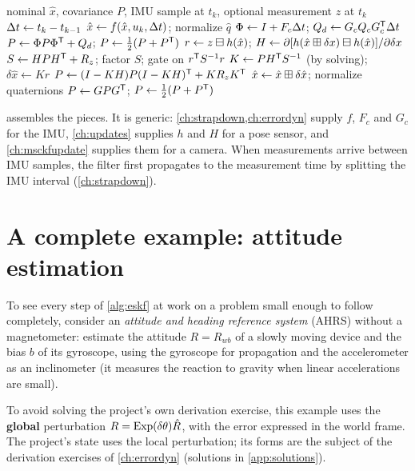 \begin{algorithm}[t]
\caption{Error-state Kalman filter (one IMU step and an optional update)}
\label{alg:eskf}
\begin{algorithmic}[1]
\Require nominal $\hat x$, covariance $P$, IMU sample at $t_k$, optional measurement $z$ at $t_k$
\State ${\Delta t} \gets t_k - t_{k-1}$ 
\State $\hat x \gets f(\hat x, u_k, {\Delta t})$; normalize $\hat q$ 
\State $\Phi \gets I + F_c{\Delta t}$; \quad $Q_d \gets G_cQ_cG_c^{\mathsf{T}}{\Delta t}$
\State $P \gets \Phi P\Phi^{\mathsf{T}} + Q_d$; \quad $P \gets \tfrac12(P + P^{\mathsf{T}})$
  \State $r \gets z\boxminus h(\hat x)$; \quad $H \gets \partial[h(\hat x\boxplus\delta x)\boxminus h(\hat x)]/\partial\delta x$
  \State $S \gets HPH^{\mathsf{T}} + R_z$; factor $S$; gate on $r^{\mathsf{T}} S^{-1} r$
  \State $K \gets PH^{\mathsf{T}} S^{-1}$ (by solving); \quad $\delta\hat x \gets Kr$
  \State $P \gets (I-KH)P(I-KH)^{\mathsf{T}} + KR_zK^{\mathsf{T}}$
  \State $\hat x \gets \hat x\boxplus\delta\hat x$; normalize quaternions 
  \State $P \gets GPG^{\mathsf{T}}$; \quad $P \gets \tfrac12(P + P^{\mathsf{T}})$ 
\EndIf
\end{algorithmic}
\end{algorithm}

 assembles the pieces. It is generic: \cref{ch:strapdown,ch:errordyn} supply $f$, $F_c$ and $G_c$ for the IMU, \cref{ch:updates} supplies $h$ and $H$ for a
pose sensor, and \cref{ch:msckfupdate} supplies them for a camera. When measurements arrive between IMU samples, the filter first propagates to the
measurement time by splitting the IMU interval (\cref{ch:strapdown}).

\section{A complete example: attitude estimation}
\label{sec:ahrs}

To see every step of \cref{alg:eskf} at work on a problem small enough to follow completely, consider an \emph{attitude and heading reference system}
(AHRS) without a magnetometer: estimate the attitude $R = R_{wb}$ of a slowly moving device and the bias $b$ of its gyroscope, using the gyroscope for
propagation and the accelerometer as an inclinometer (it measures the reaction to gravity when linear accelerations are small).

To avoid solving the project's own derivation exercise, this example uses the \textbf{global} perturbation $R = \operatorname{Exp}(\delta\theta)\hat R$, with the error
expressed in the world frame. The project's state uses the local perturbation; its forms are the subject of the derivation exercises of \cref{ch:errordyn}\ifsolutions{}
(solutions in \cref{app:solutions})\fi.

